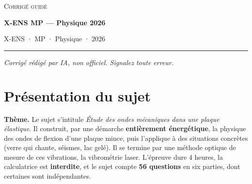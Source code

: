 \documentclass[11pt,a4paper]{article}
\begin{document}
\thispagestyle{plain}
\begin{center}
  {\small\scshape Corrigé guidé}\par\smallskip
  {\LARGE\bfseries X-ENS MP — Physique 2026\par}\medskip
  {\large X-ENS · MP · Physique · 2026\par}
\end{center}
\vspace{2pt}\hrule\vspace{8pt}

\emph{Corrigé rédigé par IA, non officiel. Signalez toute erreur.}

\hypertarget{pruxe9sentation-du-sujet}{%
\section{Présentation du sujet}\label{pruxe9sentation-du-sujet}}

\textbf{Thème.} Le sujet s'intitule \emph{Étude des ondes mécaniques dans une plaque élastique}. Il construit, par une démarche \textbf{entièrement énergétique}, la physique des ondes de flexion d'une plaque mince, puis l'applique à des situations concrètes (verre qui chante, séismes, lac gelé). Il se termine par une méthode optique de mesure de ces vibrations, la vibrométrie laser. L'épreuve dure 4 heures, la calculatrice est \textbf{interdite}, et le sujet compte \textbf{56 questions} en six parties, dont certaines sont indépendantes.
\end{document}
